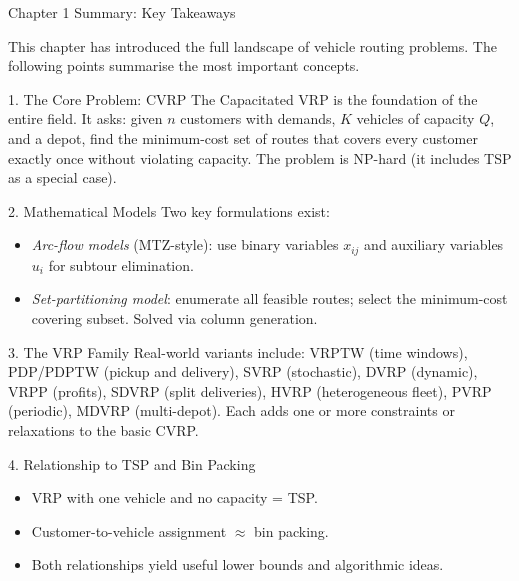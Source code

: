 \documentclass[aspectratio=169,10pt]{beamer}
\begin{document}
\begin{frame}[allowframebreaks]{Chapter 1 Summary: Key Takeaways}

This chapter has introduced the full landscape of vehicle routing problems.  The
following points summarise the most important concepts.

\begin{block}{1. The Core Problem: CVRP}
The Capacitated VRP is the foundation of the entire field.  It asks: given $n$
customers with demands, $K$ vehicles of capacity $Q$, and a depot, find the
minimum-cost set of routes that covers every customer exactly once without
violating capacity.  The problem is NP-hard (it includes TSP as a special case).
\end{block}

\begin{block}{2. Mathematical Models}
Two key formulations exist:
\begin{itemize}
  \item \emph{Arc-flow models} (MTZ-style): use binary variables $x_{ij}$ and
        auxiliary variables $u_i$ for subtour elimination.
  \item \emph{Set-partitioning model}: enumerate all feasible routes; select the
        minimum-cost covering subset.  Solved via column generation.
\end{itemize}
\end{block}

\begin{block}{3. The VRP Family}
Real-world variants include:
VRPTW (time windows), PDP/PDPTW (pickup and delivery), SVRP (stochastic),
DVRP (dynamic), VRPP (profits), SDVRP (split deliveries), HVRP (heterogeneous fleet),
PVRP (periodic), MDVRP (multi-depot).
Each adds one or more constraints or relaxations to the basic CVRP.
\end{block}

\framebreak

\begin{block}{4. Relationship to TSP and Bin Packing}
\begin{itemize}
  \item VRP with one vehicle and no capacity = TSP.
  \item Customer-to-vehicle assignment $\approx$ bin packing.
  \item Both relationships yield useful lower bounds and algorithmic ideas.
\end{itemize}
\end{block}


\end{frame}
\end{document}
